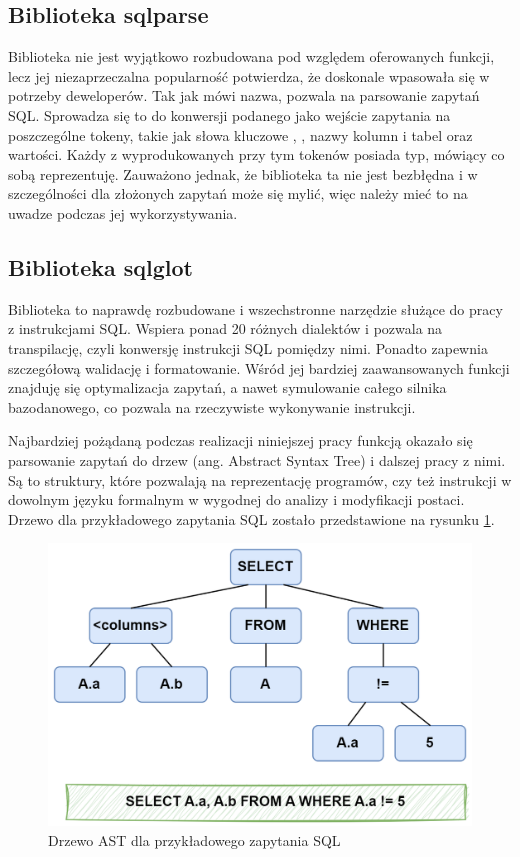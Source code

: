 \subsection{Biblioteka sqlparse}
Biblioteka  nie jest wyjątkowo rozbudowana pod względem oferowanych funkcji, lecz jej niezaprzeczalna popularność potwierdza, że doskonale wpasowała się w potrzeby deweloperów. Tak jak mówi nazwa,  pozwala na parsowanie zapytań SQL. Sprowadza się to do konwersji podanego jako wejście zapytania na poszczególne tokeny, takie jak słowa kluczowe , , nazwy kolumn i tabel oraz wartości. Każdy z wyprodukowanych przy tym tokenów posiada typ, mówiący co sobą reprezentuję. Zauważono jednak, że biblioteka ta nie jest bezbłędna i w szczególności dla złożonych zapytań może się mylić, więc należy mieć to na uwadze podczas jej wykorzystywania.

\subsection{Biblioteka sqlglot}
Biblioteka  to naprawdę rozbudowane i wszechstronne narzędzie służące do pracy z instrukcjami SQL. Wspiera ponad 20 różnych dialektów i pozwala na transpilację, czyli konwersję instrukcji SQL pomiędzy nimi. Ponadto zapewnia szczegółową walidację i formatowanie. Wśród jej bardziej zaawansowanych funkcji znajduję się optymalizacja zapytań, a nawet symulowanie całego silnika bazodanowego, co pozwala na rzeczywiste wykonywanie instrukcji.

Najbardziej pożądaną podczas realizacji niniejszej pracy funkcją okazało się parsowanie zapytań do drzew  (ang. Abstract Syntax Tree) i dalszej pracy z nimi. Są to struktury, które pozwalają na reprezentację programów, czy też instrukcji w dowolnym języku formalnym w wygodnej do analizy i modyfikacji postaci. Drzewo  dla przykładowego zapytania SQL zostało przedstawione na rysunku \ref{fig:sql-ast-example}.

\begin{figure}[ht!]
  \centering
  \includegraphics[width=0.55\linewidth]{images/ast_example.png}
  \caption{Drzewo AST dla przykładowego zapytania SQL}
  \label{fig:sql-ast-example}
\end{figure}


